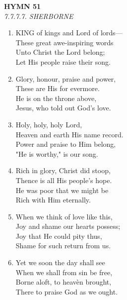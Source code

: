 \newpage
\begin{center}
    {\Large \textbf{HYMN 51}}
    \\
    \textit{7.7.7.7. SHERBORNE}
\end{center}
\vspace{1em}

\begin{enumerate}
    \item KING of kings and Lord of lords--- \\
        These great awe-inspiring words \\
        Unto Christ the Lord belong; \\
        Let His people raise their song.

    \item Glory, honour, praise and power, \\
        These are His for evermore. \\
        He is on the throne above, \\
        Jesus, who told out God's love.

    \item Holy, holy, holy Lord, \\
        Heaven and earth His name record. \\
        Power and praise to Him belong, \\
        "He is worthy," is our song.

    \item Rich in glory, Christ did stoop, \\
        Thence is all His people's hope. \\
        He was poor that we might be \\
        Rich with Him eternally.

    \item When we think of love like this, \\
        Joy and shame our hearts possess; \\
        Joy that He could pity thus, \\
        Shame for such return from us.

    \item Yet we soon the day shall see \\
        When we shall from sin be free, \\
        Borne aloft, to heav\`en brought, \\
        There to praise God as we ought.

\end{enumerate}

